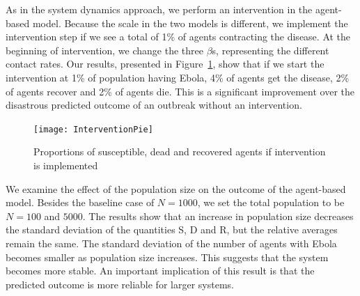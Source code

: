 As in the system dynamics approach, we perform an intervention in the agent-based model. Because the scale in the two models is different, we implement the intervention step if we see a total of 1\% of agents contracting the disease. At the beginning of intervention, we change the three $\beta$s, representing the different contact rates. Our results, presented in Figure~\ref{fig:InterventionPie}, show that if we start the intervention at 1\% of population having Ebola, 4\% of agents get the disease, 2\% of agents recover and 2\% of agents die. This is a significant improvement over the disastrous predicted outcome of an outbreak without an intervention. 



\begin{figure}[h!]
\begin{center}
\texttt{[image: InterventionPie]}
\end{center}
\caption{Proportions of susceptible, dead and recovered agents if intervention is implemented}
\label{fig:InterventionPie}
\end{figure}

We examine the effect of the population size on the outcome of the agent-based model. Besides the baseline case of $N = 1000$, we set the total population to be $N = 100$ and $5000$. The results show that an increase in population size decreases the standard deviation of the quantities S, D and R, but the relative averages remain the same. The standard deviation of the number of agents with Ebola becomes smaller as population size increases. This suggests that the system becomes more stable. An important implication of this result is that the predicted outcome is more reliable for larger systems.


